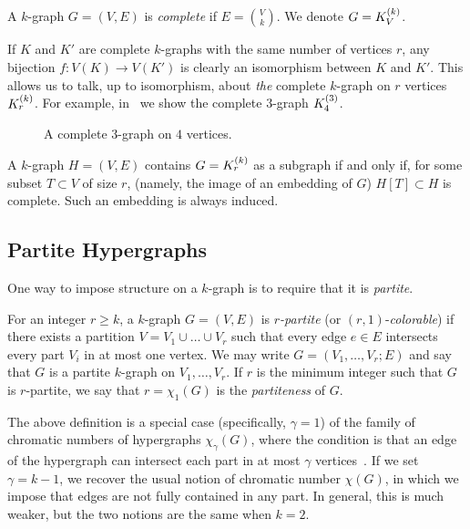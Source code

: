 \begin{definition} \label{def:complete}
    A $k$-graph $G = (V, E)$ is \emph{complete} if $E = \binom{V}{k}$.
    We denote $G = K^{(k)}_{V}$.
\end{definition}

If $K$ and $K'$ are complete $k$-graphs with the same number of vertices $r$,
any bijection $f: V(K) \to V(K')$ is clearly an isomorphism between $K$ and $K'$.
This allows us to talk, up to isomorphism, about \emph{the} complete $k$-graph on $r$ vertices $K^{(k)}_{r}$.
For example, in~ we show the complete $3$-graph $K^{(3)}_{4}$.

\begin{figure}[htbp]
    \centering
    
    \caption{A complete $3$-graph on $4$ vertices.}
    \label{fig:complete_kgraph}
\end{figure}

\begin{remark}
    A $k$-graph $H = (V, E)$ contains $G = K^{(k)}_{r}$ as a subgraph if and only if,
    for some subset $T \subset V$ of size $r$, (namely, the image of an embedding of $G$)
    $H[T] \subset H$ is complete.
    Such an embedding is always induced.
\end{remark}

\subsection{Partite Hypergraphs}\label{subsec:partite}

One way to impose structure on a $k$-graph is to require that it is \emph{partite}.

\begin{definition} \label{def:partite}
    For an integer $r \geq k$, a $k$-graph $G = (V, E)$ is \emph{$r$-partite}
    (or $(r, 1)$-\emph{colorable})
    if there exists a partition $V = V_1 \cup \dots \cup V_r$
    such that every edge $e \in E$ intersects every part $V_i$ in at most one vertex.
    We may write $G = (V_1, \dots, V_r; E)$ and say that
    $G$ is a partite $k$-graph on $V_1, \dots, V_r$.
    If $r$ is the minimum integer such that $G$ is $r$-partite,
    we say that $r = \chi_{1}(G)$ is the \emph{partiteness} of $G$.
\end{definition}

The above definition is a special case (specifically, $\gamma = 1$)
of the family of chromatic numbers of hypergraphs $\chi_{\gamma}(G)$,
where the condition is that an edge of the hypergraph can intersect each part in at most
$\gamma$ vertices~\cite{krivelevich1998chromatic}.
If we set $\gamma = k - 1$, we recover the usual notion of chromatic number $\chi(G)$,
in which we impose that edges are not fully contained in any part.
In general, this is much weaker, but the two notions are the same when $k = 2$.

